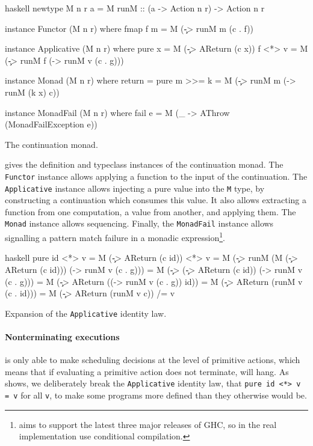 \begin{listing}
\centering
\begin{cminted}{haskell}
newtype M n r a = M { runM :: (a -> Action n r) -> Action n r }

instance Functor (M n r) where
  fmap f m = M (\c -> runM m (c . f))

instance Applicative (M n r) where
  pure x  = M (\c -> AReturn (c x))
  f <*> v = M (\c -> runM f (\g -> runM v (c . g)))

instance Monad (M n r) where
  return  = pure
  m >>= k = M (\c -> runM m (\x -> runM (k x) c))

instance MonadFail (M n r) where
  fail e = M (\_ -> AThrow (MonadFailException e))
\end{cminted}
\caption{The \dejafu{} continuation monad.}\label{lst:m}
\end{listing}

 gives the definition and typeclass instances of the
\dejafu{} continuation monad.  The \verb|Functor| instance allows
applying a function to the input of the continuation.  The
\verb|Applicative| instance allows injecting a pure value into the
\verb|M| type, by constructing a continuation which consumes this
value.  It also allows extracting a function from one computation, a
value from another, and applying them.  The \verb|Monad| instance
allows sequencing.  Finally, the \verb|MonadFail| instance allows
signalling a pattern match failure in a monadic
expression\footnote{\dejafu{} aims to support the latest three major
  releases of GHC, so in the real implementation use conditional
  compilation.}.

\begin{listing}
\centering
\begin{cminted}{haskell}
pure id <*> v
  = M (\c -> AReturn (c id)) <*> v
  = M (\c -> runM (M (\c -> AReturn (c id))) (\g -> runM v (c . g)))
  = M (\c -> (\c -> AReturn (c id)) (\g -> runM v (c . g)))
  = M (\c -> AReturn ((\g -> runM v (c . g)) id))
  = M (\c -> AReturn (runM v (c . id)))
  = M (\c -> AReturn (runM v c))
 /= v
\end{cminted}
\caption{Expansion of the \texttt{Applicative} identity law.}\label{lst:areturn}
\end{listing}

\paragraph{Nonterminating executions}
\dejafu{} is only able to make scheduling decisions at the level of
primitive actions, which means that if evaluating a primitive action
does not terminate, \dejafu{} will hang.  As  shows,
we deliberately break the \verb|Applicative| identity law, that
\verb|pure id <*> v = v| for all \verb|v|, to make some programs more
defined than they otherwise would be.

